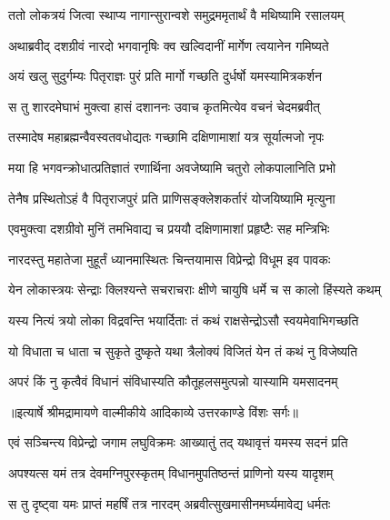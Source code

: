 \twolineshloka
{ततो लोकत्रयं जित्वा स्थाप्य नागान्सुरान्वशे}
{समुद्रममृतार्थं वै मथिष्यामि रसालयम्} %

\twolineshloka
{अथाब्रवीद् दशग्रीवं नारदो भगवानृषिः}
{क्व खल्विदानीं मार्गेण त्वयानेन गमिष्यते} %

\twolineshloka
{अयं खलु सुदुर्गम्यः पितृराज्ञः पुरं प्रति}
{मार्गो गच्छति दुर्धर्षो यमस्यामित्रकर्शन} %

\twolineshloka
{स तु शारदमेघाभं मुक्त्वा हासं दशाननः}
{उवाच कृतमित्येव वचनं चेदमब्रवीत्} %

\twolineshloka
{तस्मादेष महाब्रह्मन्वैवस्वतवधोद्यतः}
{गच्छामि दक्षिणामाशां यत्र सूर्यात्मजो नृपः} %

\twolineshloka
{मया हि भगवन्क्रोधात्प्रतिज्ञातं रणार्थिना}
{अवजेष्यामि चतुरो लोकपालानिति प्रभो} %

\twolineshloka
{तेनैष प्रस्थितोऽहं वै पितृराजपुरं प्रति}
{प्राणिसङ्क्लेशकर्तारं योजयिष्यामि मृत्युना} %

\twolineshloka
{एवमुक्त्वा दशग्रीवो मुनिं तमभिवाद्य च}
{प्रययौ दक्षिणामाशां प्रहृष्टैः सह मन्त्रिभिः} %

\twolineshloka
{नारदस्तु महातेजा मुहूर्तं ध्यानमास्थितः}
{चिन्तयामास विप्रेन्द्रो विधूम इव पावकः} %

\twolineshloka
{येन लोकास्त्रयः सेन्द्राः क्लिश्यन्ते सचराचराः}
{क्षीणे चायुषि धर्मे च स कालो हिंस्यते कथम्} %

\twolineshloka
{यस्य नित्यं त्रयो लोका विद्रवन्ति भयार्दिताः}
{तं कथं राक्षसेन्द्रोऽसौ स्वयमेवाभिगच्छति} %

\twolineshloka
{यो विधाता च धाता च सुकृते दुष्कृते यथा}
{त्रैलोक्यं विजितं येन तं कथं नु विजेष्यति} %

\twolineshloka
{अपरं किं नु कृत्वैवं विधानं संविधास्यति}
{कौतूहलसमुत्पन्नो यास्यामि यमसादनम्} %


{॥इत्यार्षे श्रीमद्रामायणे वाल्मीकीये आदिकाव्ये उत्तरकाण्डे विंशः सर्गः॥}


\twolineshloka
{एवं सञ्चिन्त्य विप्रेन्द्रो जगाम लघुविक्रमः}
{आख्यातुं तद् यथावृत्तं यमस्य सदनं प्रति} %

\twolineshloka
{अपश्यत्स यमं तत्र देवमग्निपुरस्कृतम्}
{विधानमुपतिष्ठन्तं प्राणिनो यस्य यादृशम्} %

\twolineshloka
{स तु दृष्ट्वा यमः प्राप्तं महर्षिं तत्र नारदम्}
{अब्रवीत्सुखमासीनमर्घ्यमावेद्य धर्मतः} %

